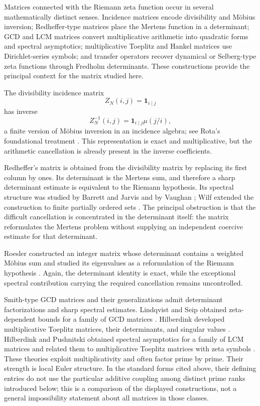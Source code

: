 \documentclass[11pt]{amsart}
\numberwithin{equation}{section}
\theoremstyle{plain}
\theoremstyle{definition}
\theoremstyle{remark}
\begin{document}
Matrices connected with the Riemann zeta function occur in several mathematically distinct senses.  Incidence matrices encode divisibility and M\"obius inversion; Redheffer-type matrices place the Mertens function in a determinant; GCD and LCM matrices convert multiplicative arithmetic into quadratic forms and spectral asymptotics; multiplicative Toeplitz and Hankel matrices use Dirichlet-series symbols; and transfer operators recover dynamical or Selberg-type zeta functions through Fredholm determinants.  These constructions provide the principal context for the matrix studied here.

The divisibility incidence matrix
\begin{equation}
Z_N(i,j)=\mathbf 1_{i\mid j}
\label{eq:divisibility_incidence}
\end{equation}
has inverse
\begin{equation}
Z_N^{-1}(i,j)=\mathbf 1_{i\mid j}\mu(j/i),
\label{eq:divisibility_inverse}
\end{equation}
a finite version of M\"obius inversion in an incidence algebra; see Rota's foundational treatment \cite{Rota1964}.  This representation is exact and multiplicative, but the arithmetic cancellation is already present in the inverse coefficients.

Redheffer's matrix is obtained from the divisibility matrix by replacing its first column by ones.  Its determinant is the Mertens sum, and therefore a sharp determinant estimate is equivalent to the Riemann hypothesis.  Its spectral structure was studied by Barrett and Jarvis and by Vaughan \cite{BarrettJarvis1992,Vaughan1996}; Wilf extended the construction to finite partially ordered sets \cite{Wilf2004}.  The principal obstruction is that the difficult cancellation is concentrated in the determinant itself: the matrix reformulates the Mertens problem without supplying an independent coercive estimate for that determinant.

Roesler constructed an integer matrix whose determinant contains a weighted M\"obius sum and studied its eigenvalues as a reformulation of the Riemann hypothesis \cite{Roesler1986,Roesler1987}.  Again, the determinant identity is exact, while the exceptional spectral contribution carrying the required cancellation remains uncontrolled.

Smith-type GCD matrices and their generalizations admit determinant factorizations and sharp spectral estimates.  Lindqvist and Seip obtained zeta-dependent bounds for a family of GCD matrices \cite{LindqvistSeip1998}.  Hilberdink developed multiplicative Toeplitz matrices, their determinants, and singular values \cite{Hilberdink2006,Hilberdink2015,Hilberdink2017}.  Hilberdink and Pushnitski obtained spectral asymptotics for a family of LCM matrices and related them to multiplicative Toeplitz matrices with zeta symbols \cite{HilberdinkPushnitski2023}.  These theories exploit multiplicativity and often factor prime by prime.  Their strength is local Euler structure.  In the standard forms cited above, their defining entries do not use the particular additive coupling among distinct prime ranks introduced below; this is a comparison of the displayed constructions, not a general impossibility statement about all matrices in those classes.
\end{document}
